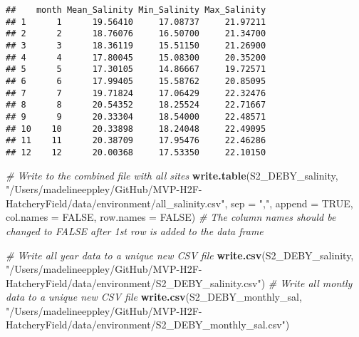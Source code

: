 \documentclass[
]{article}
\newenvironment{Shaded}{\begin{snugshade}}{\end{snugshade}}
\newcommand{\AttributeTok}[1]{\textcolor[rgb]{0.13,0.29,0.53}{#1}}
\newcommand{\CommentTok}[1]{\textcolor[rgb]{0.56,0.35,0.01}{\textit{#1}}}
\newcommand{\ConstantTok}[1]{\textcolor[rgb]{0.56,0.35,0.01}{#1}}
\newcommand{\FunctionTok}[1]{\textcolor[rgb]{0.13,0.29,0.53}{\textbf{#1}}}
\newcommand{\NormalTok}[1]{#1}
\newcommand{\StringTok}[1]{\textcolor[rgb]{0.31,0.60,0.02}{#1}}
\begin{document}
\begin{verbatim}
##    month Mean_Salinity Min_Salinity Max_Salinity
## 1      1      19.56410     17.08737     21.97211
## 2      2      18.76076     16.50700     21.34700
## 3      3      18.36119     15.51150     21.26900
## 4      4      17.80045     15.08300     20.35200
## 5      5      17.30105     14.86667     19.72571
## 6      6      17.99405     15.58762     20.85095
## 7      7      19.71824     17.06429     22.32476
## 8      8      20.54352     18.25524     22.71667
## 9      9      20.33304     18.54000     22.48571
## 10    10      20.33898     18.24048     22.49095
## 11    11      20.38709     17.95476     22.46286
## 12    12      20.00368     17.53350     22.10150
\end{verbatim}

\begin{Shaded}
\begin{Highlighting}[]
\CommentTok{\# Write to the combined file with all sites }
\FunctionTok{write.table}\NormalTok{(S2\_DEBY\_salinity, }\StringTok{"/Users/madelineeppley/GitHub/MVP{-}H2F{-}HatcheryField/data/environment/all\_salinity.csv"}\NormalTok{, }\AttributeTok{sep =} \StringTok{","}\NormalTok{, }\AttributeTok{append =} \ConstantTok{TRUE}\NormalTok{, }\AttributeTok{col.names =} \ConstantTok{FALSE}\NormalTok{, }\AttributeTok{row.names =} \ConstantTok{FALSE}\NormalTok{) }\CommentTok{\# The column names should be changed to FALSE after 1st row is added to the data frame}

\CommentTok{\# Write all year data to a unique new CSV file}
\FunctionTok{write.csv}\NormalTok{(S2\_DEBY\_salinity, }\StringTok{"/Users/madelineeppley/GitHub/MVP{-}H2F{-}HatcheryField/data/environment/S2\_DEBY\_salinity.csv"}\NormalTok{)}
\CommentTok{\# Write all montly data to a unique new CSV file}
\FunctionTok{write.csv}\NormalTok{(S2\_DEBY\_monthly\_sal, }\StringTok{"/Users/madelineeppley/GitHub/MVP{-}H2F{-}HatcheryField/data/environment/S2\_DEBY\_monthly\_sal.csv"}\NormalTok{)}
\end{Highlighting}
\end{Shaded}
\end{document}
